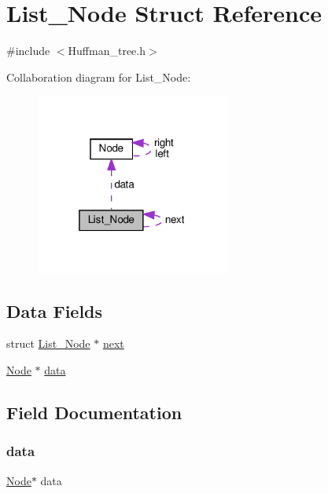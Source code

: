\hypertarget{struct_list___node}{}\section{List\+\_\+\+Node Struct Reference}
\label{struct_list___node}


{\ttfamily \#include $<$Huffman\+\_\+tree.\+h$>$}



Collaboration diagram for List\+\_\+\+Node\+:\nopagebreak
\begin{figure}[H]
\begin{center}
\leavevmode
\includegraphics[width=181pt]{struct_list___node__coll__graph}
\end{center}
\end{figure}
\subsection*{Data Fields}
\begin{DoxyCompactItemize}
\item 
struct \hyperlink{struct_list___node}{List\+\_\+\+Node} $\ast$ \hyperlink{struct_list___node_a953735a376f9ca61964264503df3340f}{next}
\item 
\hyperlink{struct_node}{Node} $\ast$ \hyperlink{struct_list___node_a3cf6bebe15c5a482d08f7c9cb9d6fb80}{data}
\end{DoxyCompactItemize}


\subsection{Field Documentation}
\mbox{\label{struct_list___node_a3cf6bebe15c5a482d08f7c9cb9d6fb80}} 
\subsubsection{\texorpdfstring{data}{data}}
{\footnotesize\ttfamily \hyperlink{struct_node}{Node}$\ast$ data}


